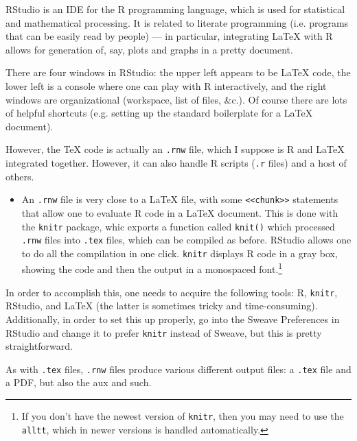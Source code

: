 %
RStudio is an IDE for the R programming language, which is used for statistical and mathematical processing. It is related to literate programming (i.e. programs that can be easily read by people) --- in particular, integrating \LaTeX{} with R allows for generation of, say, plots and graphs in a pretty document.

There are four windows in RStudio: the upper left appears to be \LaTeX{} code, the lower left is a console where one can play with R interactively, and the right windows are organizational (workspace, list of files, \&c.). Of course there are lots of helpful shortcuts (e.g. setting up the standard boilerplate for a \LaTeX{} document).

However, the \TeX{} code is actually an \texttt{.rnw} file, which I suppose is R and \LaTeX{} integrated together. However, it can also handle R scripts (\texttt{.r} files) and a host of others.
\begin{itemize}
\item An \texttt{.rnw} file is very close to a \LaTeX{} file, with some \verb+<<chunk>>+ statements that allow one to evaluate R code in a \LaTeX{} document. This is done with the \verb+knitr+ package, whic exports a function called \verb+knit()+ which processed \texttt{.rnw} files into \texttt{.tex} files, which can be compiled as before. RStudio allows one to do all the compilation in one click. \verb+knitr+ displays R code in a gray box, showing the code and then the output in a monospaced font.\footnote{If you don't have the newest version of \texttt{knitr}, then you may need to use the \texttt{alltt}, which in newer versions is handled automatically.}
\end{itemize}
In order to accomplish this, one needs to acquire the following tools: R, \texttt{knitr}, RStudio, and \LaTeX{} (the latter is sometimes tricky and time-consuming). Additionally, in order to set this up properly, go into the Sweave Preferences in RStudio and change it to prefer \texttt{knitr} instead of Sweave, but this is pretty straightforward.

As with \texttt{.tex} files, \texttt{.rnw} files produce various different output files: a \texttt{.tex} file and a PDF, but also the aux and such.

